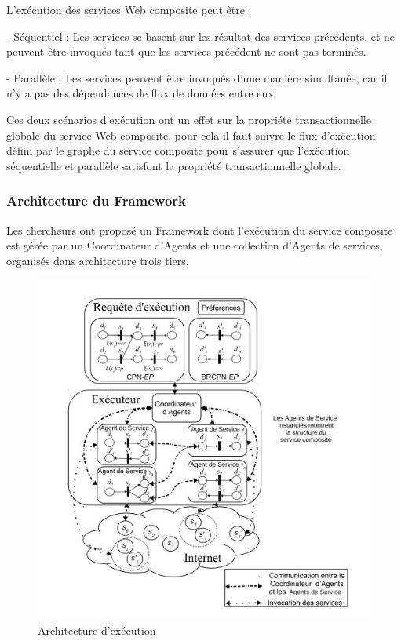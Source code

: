 L'exécution des services Web composite peut être \cite{3} : 

- Séquentiel : Les services se basent sur les résultat des services précédents, et ne peuvent être invoqués tant que les services précédent ne sont pas terminés.

- Parallèle : Les services peuvent être invoqués d'une manière simultanée, car il n'y a pas des dépendances de flux de données entre eux.

Ces deux scénarios d'exécution ont un effet sur la propriété transactionnelle globale du service Web composite, pour cela il faut suivre le flux d'exécution défini par le graphe du service composite pour s'assurer que l'exécution séquentielle et parallèle satisfont la propriété transactionnelle globale.

\subsubsection{Architecture du Framework}

Les chercheurs ont proposé un Framework dont l'exécution du service composite est gérée par un Coordinateur d'Agents et une collection d'Agents de services, organisés dans architecture trois tiers.

\begin{figure}[H]
\begin{center}
\includegraphics[width=1\linewidth]{images/architecture Frmwork.jpg}
\end{center}
\caption{Architecture d'exécution \cite{1}}
\label{fig:4}
\end{figure}


